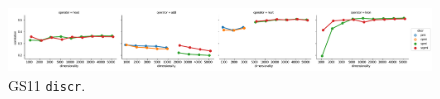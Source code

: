 \begin{figure}[b]
  \centering

  \includegraphics[width=1.1\textwidth]{supplement/figures/gs11-interaction-discr}

  \caption{GS11 \texttt{discr}.}
  \label{fig:gs11-discr}
\end{figure}
